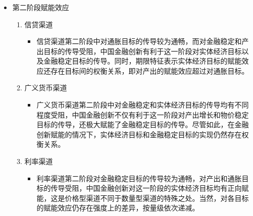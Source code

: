 \documentclass[12pt,aspectratio=169]{ctexbeamer}
\begin{document}
			\begin{frame}
				\frametitle{}
					\begin{itemize}
						\item 第二阶段赋能效应
						\begin{enumerate}
							\item 信贷渠道
							\begin{itemize}
								\justifying
								\item 信贷渠道第二阶段中对通胀目标的传导较为通畅，而对金融稳定和产出目标的传导受阻，中国金融创新有利于这一阶段对实体经济目标以及金融稳定目标的传导。同时，期限特征表示实体经济目标的赋能效应还存在目标间的权衡关系，即对产出的赋能效应超过对通胀目标。
							\end{itemize}
							\item 广义货币渠道
							\begin{itemize}
								\justifying
								\item 广义货币渠道第二阶段中对金融稳定和实体经济目标的传导均有不同程度受阻，中国金融创新不仅有利于这一阶段对产出增长和物价稳定目标的传导，还极大赋能了金融稳定目标的传导。尽管如此，在金融创新赋能的情况下，实体经济目标和金融稳定目标的实现仍然存在权衡关系。
							\end{itemize}
							\item 利率渠道
							\begin{itemize}
								\justifying
								\item 利率渠道第二阶段对金融稳定目标的传导较为通畅，对产出和通胀目标的传导受阻，中国金融创新对这一阶段的实体经济目标均有正向赋能，这是价格型渠道不同于数量型渠道的特殊之处。当然，对各目标的赋能效应仍存在强度上的差异，按量级依次递减。
							\end{itemize}
						\end{enumerate}
						
						\end{itemize}
			\end{frame}
\end{document}
